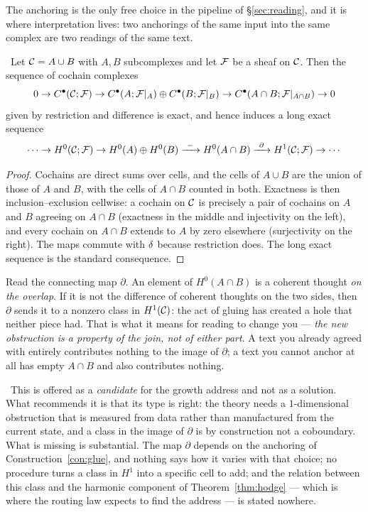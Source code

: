 The anchoring is the only free choice in the pipeline of
\S\ref{sec:reading}, and it is where interpretation lives: two anchorings of
the same input into the same complex are two readings of the same text.

\begin{proposition}\label{prop:mv}
\Proved\ Let $\mathcal{C}=A\cup B$ with $A,B$ subcomplexes and let $\mathcal{F}$ be a sheaf
on $\mathcal{C}$. Then the sequence of cochain complexes
\[
  0\to C^\bullet(\mathcal{C};\mathcal{F})\to
  C^\bullet(A;\mathcal{F}|_A)\oplus C^\bullet(B;\mathcal{F}|_B)\to
  C^\bullet(A\cap B;\mathcal{F}|_{A\cap B})\to 0
\]
given by restriction and difference is exact, and hence induces a long exact
sequence
\[
  \cdots\to H^0(\mathcal{C};\mathcal{F})\to H^0(A)\oplus H^0(B)
  \xrightarrow{\ -\ } H^0(A\cap B)
  \xrightarrow{\ \partial\ } H^1(\mathcal{C};\mathcal{F})\to\cdots
\]
\end{proposition}
\begin{proof}
Cochains are direct sums over cells, and the cells of $A\cup B$ are the union
of those of $A$ and $B$, with the cells of $A\cap B$ counted in both. Exactness
is then inclusion--exclusion cellwise: a cochain on $\mathcal{C}$ is precisely a pair
of cochains on $A$ and $B$ agreeing on $A\cap B$ (exactness in the middle and
injectivity on the left), and every cochain on $A\cap B$ extends to $A$ by
zero elsewhere (surjectivity on the right). The maps commute with $\delta$
because restriction does. The long exact sequence is the standard consequence.
\end{proof}

\begin{intu}\Intu
Read the connecting map $\partial$. An element of $H^0(A\cap B)$ is a coherent
thought \emph{on the overlap}. If it is not the difference of coherent
thoughts on the two sides, then $\partial$ sends it to a nonzero class in
$H^1(\mathcal{C})$: the act of gluing has created a hole that neither piece
had. That is what it means for reading to change you --- \emph{the new
obstruction is a property of the join, not of either part}. A text you already
agreed with entirely contributes nothing to the image of $\partial$; a text
you cannot anchor at all has empty $A\cap B$ and also contributes nothing.
\end{intu}

\begin{hon}\Hon
\Proposed\ This is offered as a \emph{candidate} for the growth address and
not as a solution. What recommends it is that its type is right: the theory
needs a $1$-dimensional obstruction that is measured from data rather than
manufactured from the current state, and a class in the image of $\partial$ is
by construction not a coboundary. What is missing is substantial. The map
$\partial$ depends on the anchoring of Construction~\ref{con:glue}, and
nothing says how it varies with that choice; no procedure turns a class in
$H^1$ into a specific cell to add; and the relation between this class and the
harmonic component of Theorem~\ref{thm:hodge} --- which is where the routing
law expects to find the address --- is stated nowhere.
\end{hon}

